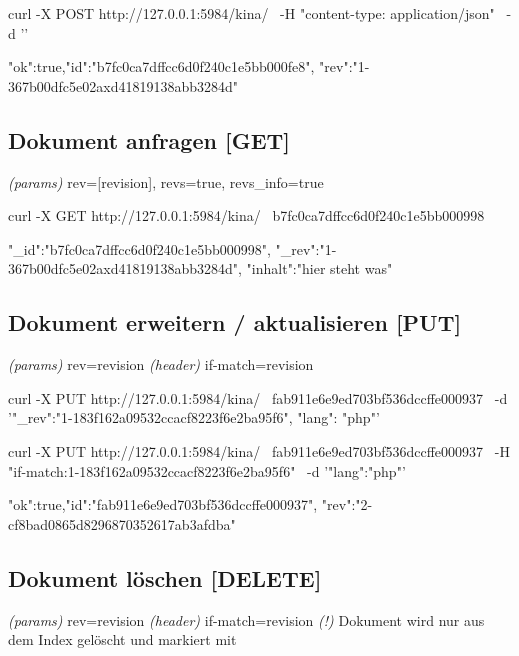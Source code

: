 \documentclass[19pt,landscape,twocolumn]{article}
\newcommand{\mono}[1]{\texttt{\textendash\textendash {#1}}}
\newcommand{\htmlverb}[1]{{[}\textbf{{#1}}{]}}
\newcommand{\setparskip}{\setlength{\parskip}{-6mm}}
\newcommand{\resetparskip}{\setlength{\parskip}{1mm}}
\begin{document}
\begin{code}
curl -X POST http://127.0.0.1:5984/kina/ \
     -H "content-type: application/json" \
     -d '{}'
\end{code}
\setparskip
\begin{response}
{"ok":true,"id":"b7fc0ca7dffcc6d0f240c1e5bb000fe8",
 "rev":"1-367b00dfc5e02axd41819138abb3284d"}
\end{response}
\resetparskip

\subsection{Dokument anfragen \htmlverb{GET}}
\emph{(params)} rev={[}revision{]}, revs=true, revs\_info=true

\begin{code}
curl -X GET http://127.0.0.1:5984/kina/ \
  b7fc0ca7dffcc6d0f240c1e5bb000998
\end{code}
\setparskip
\begin{response}
{"_id":"b7fc0ca7dffcc6d0f240c1e5bb000998",
 "_rev":"1-367b00dfc5e02axd41819138abb3284d",
 "inhalt":"hier steht was"}
\end{response}
\resetparskip

\subsection{Dokument erweitern / aktualisieren \htmlverb{PUT}}
\emph{(params)} rev=revision \newline
\emph{(header)} if-match=revision

\begin{code}
curl -X PUT http://127.0.0.1:5984/kina/ \
  fab911e6e9ed703bf536dccffe000937 \
     -d '{"_rev":"1-183f162a09532ccacf8223f6e2ba95f6",
          "lang": "php"}'
\end{code}

\begin{code}
curl -X PUT http://127.0.0.1:5984/kina/ \
  fab911e6e9ed703bf536dccffe000937 \
  -H "if-match:1-183f162a09532ccacf8223f6e2ba95f6" \
  -d '{"lang":"php"}'
\end{code}
\setparskip
\begin{response}
{"ok":true,"id":"fab911e6e9ed703bf536dccffe000937",
 "rev":"2-cf8bad0865d8296870352617ab3afdba"}
\end{response}
\resetparskip

\subsection{Dokument löschen \htmlverb{DELETE}}
\emph{(params)} rev=revision \newline
\emph{(header)} if-match=revision \newline
\emph{(!)} Dokument wird nur aus dem Index gelöscht und markiert \newline
 mit \mono{deleted:true}
\end{document}
